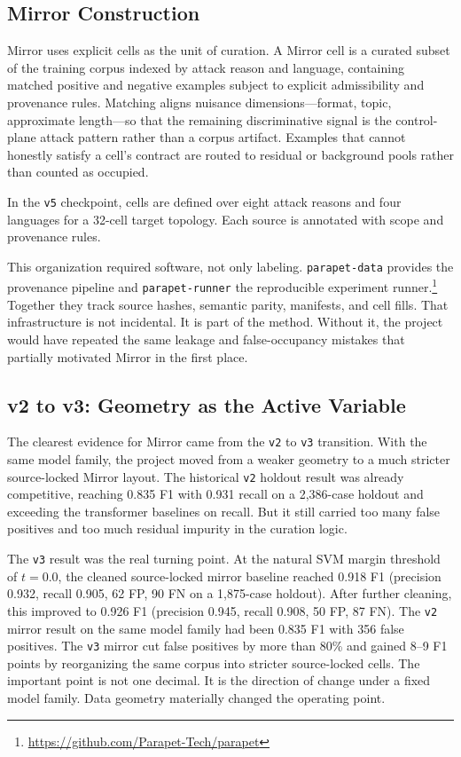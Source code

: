 \documentclass[11pt,a4paper]{article}
\begin{document}
\subsection{Mirror Construction}
\label{sec:construction}

Mirror uses explicit cells as the unit of curation. A Mirror cell is a
curated subset of the training corpus indexed by attack reason and
language, containing matched positive and negative examples subject to
explicit admissibility and provenance rules. Matching aligns nuisance
dimensions---format, topic, approximate length---so that the remaining
discriminative signal is the control-plane attack pattern rather than a
corpus artifact. Examples that cannot honestly satisfy a cell's contract
are routed to residual or background pools rather than counted as
occupied.

In the \texttt{v5} checkpoint, cells are defined over eight attack
reasons and four languages for a 32-cell target topology. Each source is
annotated with scope and provenance rules.

This organization required software, not only labeling.
\texttt{parapet-data} provides the provenance pipeline and
\texttt{parapet-runner} the reproducible experiment
runner.\footnote{\url{https://github.com/Parapet-Tech/parapet}}
Together they track source hashes, semantic parity, manifests, and cell
fills. That infrastructure is not incidental. It is part of the method.
Without it, the project would have repeated the same leakage and
false-occupancy mistakes that partially motivated Mirror in the first
place.

\subsection{v2 to v3: Geometry as the Active Variable}
\label{sec:v2-v3}

The clearest evidence for Mirror came from the \texttt{v2} to
\texttt{v3} transition. With the same model family, the project moved
from a weaker geometry to a much stricter source-locked Mirror layout.
The historical \texttt{v2} holdout result was already competitive,
reaching 0.835 F1 with 0.931 recall on a 2,386-case holdout and
exceeding the transformer baselines on recall. But it still carried too
many false positives and too much residual impurity in the curation
logic.

The \texttt{v3} result was the real turning point. At the natural SVM
margin threshold of $t = 0.0$, the cleaned source-locked mirror baseline
reached 0.918 F1 (precision 0.932, recall 0.905, 62 FP, 90 FN on a
1,875-case holdout). After further cleaning, this improved to 0.926 F1
(precision 0.945, recall 0.908, 50 FP, 87 FN). The \texttt{v2} mirror
result on the same model family had been 0.835 F1 with 356 false
positives. The \texttt{v3} mirror cut false positives by more than 80\%
and gained 8--9 F1 points by reorganizing the same corpus into stricter
source-locked cells. The important point is not one decimal. It is the
direction of change under a fixed model family. Data geometry materially
changed the operating point.
\end{document}

